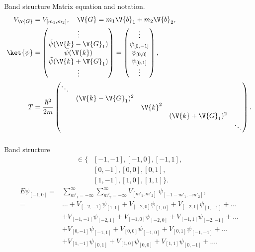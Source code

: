 \documentclass{beamer}
\newcommand{\coef}[1]{_{[#1]}}
\begin{document}
\begin{frame}{Band structure}
Matrix equation and notation.
\begin{align*}
V_{\V{G}} &= V\coef{m_1, m_2}, \quad \V{G} = m_1 \V{b}_1 + m_2 \V{b}_2, \\
\ket{\psi} &= \begin{pmatrix}
\vdots \\ \tilde{\psi}(\V{k}-\V{G}_1) \\ \tilde{\psi}(\V{k}) \\ \tilde{\psi}(\V{k}+\V{G}_1) \\ \vdots
\end{pmatrix} = \begin{pmatrix}
\vdots \\ \psi\coef{0, -1}\\ \psi\coef{0, 0} \\ \psi\coef{0, 1} \\ \vdots
\end{pmatrix}, \\
T &= \frac{\hbar^2}{2m} \begin{pmatrix}
\ddots	& 		 			&			& 					& \\
& (\V{k}-\V{G}_1)^2	& 			& 					& \\
& 	 				& \V{k}^2	& 					& \\
&					&			& (\V{k}+\V{G}_1)^2	& \\
&					&			&					& \ddots
\end{pmatrix}.
\end{align*}
\begin{equation*}
\end{equation*}
\end{frame}

\begin{frame}{Band structure}
\begin{align*}
[m_1, m_2] \in \{ &[-1, -1], [-1, 0], [-1, 1],\\ &[0, -1], [0, 0], [0, 1],\\ &[1,-1], [1, 0], [1,1]  \}.
\end{align*}
\begin{align*}
E \psi\coef{-1,0} = {} & \sum_{m'_1 =  -\infty}^{\infty}\sum_{m'_2 = -\infty}^{\infty} V\coef{m'_1, m'_2} \ \psi\coef{-1-m'_1, -m'_2}, \\
= {} & \dots +  V\coef{-2, -1}\psi\coef{1,1} + V\coef{-2, 0} \psi\coef{1, 0} + V\coef{-2, 1}\psi\coef{1,-1} +  \dots  \\
& + V\coef{-1, -1} \psi\coef{-2, 1} + V\coef{-1, 0} \psi\coef{-2, 0} + V\coef{-1, 1} \psi\coef{-2, -1} + \dots\\
& + V\coef{0, -1} \psi\coef{-1, 1} + V\coef{0, 0} \psi\coef{-1, 0} + V\coef{0, 1}\psi\coef{-1, -1} + \dots\\
&+ V\coef{1, -1} \psi \coef{0,1} + V\coef{1, 0} \psi \coef{0, 0} + V\coef{1,1} \psi \coef{0, -1} + \dots.
\end{align*}
\end{frame}
\end{document}
